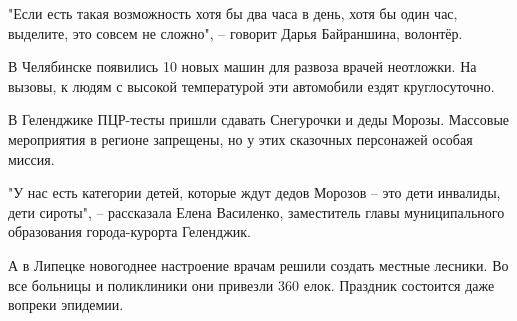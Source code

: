"Если есть такая возможность хотя бы два часа в день, хотя бы один час,
выделите, это совсем не сложно", – говорит Дарья Байраншина, волонтёр.

В Челябинске появились 10 новых машин для развоза врачей неотложки. На вызовы,
к людям с высокой температурой эти автомобили ездят круглосуточно.

В Геленджике ПЦР-тесты пришли сдавать Снегурочки и деды Морозы. Массовые
мероприятия в регионе запрещены, но у этих сказочных персонажей особая миссия.

"У нас есть категории детей, которые ждут дедов Морозов – это дети инвалиды,
дети сироты", – рассказала Елена Василенко, заместитель главы муниципального
образования города-курорта Геленджик.

А в Липецке новогоднее настроение врачам решили создать местные лесники. Во все
больницы и поликлиники они привезли 360 елок. Праздник состоится даже вопреки
эпидемии.
